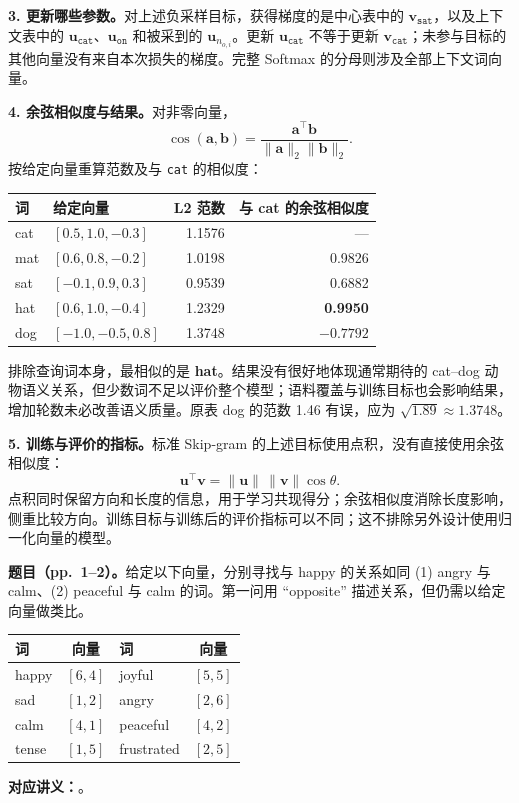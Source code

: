 \textbf{3. 更新哪些参数。}对上述负采样目标，获得梯度的是中心表中的 $\mathbf v_{\texttt{sat}}$，以及上下文表中的 $\mathbf u_{\texttt{cat}}$、$\mathbf u_{\texttt{on}}$ 和被采到的 $\mathbf u_{n_{o,i}}$。更新 $\mathbf u_{\texttt{cat}}$ 不等于更新 $\mathbf v_{\texttt{cat}}$；未参与目标的其他向量没有来自本次损失的梯度。完整 Softmax 的分母则涉及全部上下文词向量。

\textbf{4. 余弦相似度与结果。}对非零向量，
\[
 \cos(\mathbf a,\mathbf b)
 =\frac{\mathbf a^\top\mathbf b}{\|\mathbf a\|_2\|\mathbf b\|_2}.
\]
按给定向量重算范数及与 \texttt{cat} 的相似度：
\begin{center}
\begin{tabular}{@{}l l r r@{}}
\toprule
词 & 给定向量 & L2 范数 & 与 cat 的余弦相似度 \\
\midrule
cat & $[0.5,1.0,-0.3]$ & 1.1576 & --- \\
mat & $[0.6,0.8,-0.2]$ & 1.0198 & 0.9826 \\
sat & $[-0.1,0.9,0.3]$ & 0.9539 & 0.6882 \\
hat & $[0.6,1.0,-0.4]$ & 1.2329 & \textbf{0.9950} \\
dog & $[-1.0,-0.5,0.8]$ & 1.3748 & $-0.7792$ \\
\bottomrule
\end{tabular}
\end{center}
排除查询词本身，最相似的是 \textbf{hat}。结果没有很好地体现通常期待的 cat--dog 动物语义关系，但少数词不足以评价整个模型；语料覆盖与训练目标也会影响结果，增加轮数未必改善语义质量。原表 dog 的范数 1.46 有误，应为 $\sqrt{1.89}\approx1.3748$。

\textbf{5. 训练与评价的指标。}标准 Skip-gram 的上述目标使用点积，没有直接使用余弦相似度：
\[
 \mathbf u^\top\mathbf v=\|\mathbf u\|\,\|\mathbf v\|\cos\theta.
\]
点积同时保留方向和长度的信息，用于学习共现得分；余弦相似度消除长度影响，侧重比较方向。训练目标与训练后的评价指标可以不同；这不排除另外设计使用归一化向量的模型。

\nopagebreak[4]

\textbf{题目（pp.~1--2）。}给定以下向量，分别寻找与 happy 的关系如同 (1) angry 与 calm、(2) peaceful 与 calm 的词。第一问用 ``opposite'' 描述关系，但仍需以给定向量做类比。
\begin{center}
\begin{tabular}{@{}l c @{\qquad} l c@{}}
\toprule
词 & 向量 & 词 & 向量 \\
\midrule
happy & $[6,4]$ & joyful & $[5,5]$ \\
sad & $[1,2]$ & angry & $[2,6]$ \\
calm & $[4,1]$ & peaceful & $[4,2]$ \\
tense & $[1,5]$ & frustrated & $[2,5]$ \\
\bottomrule
\end{tabular}
\end{center}
\textbf{对应讲义：}。


